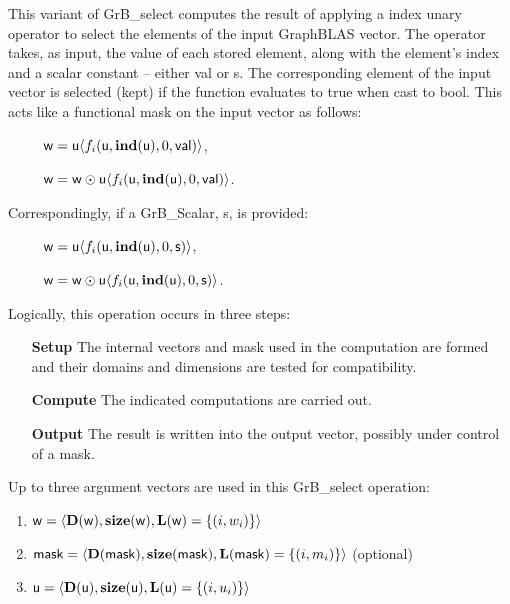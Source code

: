 This variant of {\sf GrB\_select} computes the result of applying a index unary operator
to select the elements of the input GraphBLAS vector.  The operator takes, as input,
the value of each stored element, along with the element's index and a scalar 
constant -- either {\sf val} or {\sf s}.  The corresponding element of the input vector is selected (kept)
if the function evaluates to {\sf true} when cast to {\sf bool}.  This acts like a
functional mask on the input vector as follows:
\begin{itemize}[leftmargin=2.1in]
\item[~] ${\sf w} = {\sf u}\langle f_i({\sf u}, \bold{ind}({\sf u}), 0, {\sf val})\rangle$,
\item[~] ${\sf w} = {\sf w} \odot {\sf u}\langle f_i({\sf u}, \bold{ind}({\sf u}), 0, {\sf val})\rangle$.  
\end{itemize}
Correspondingly, if a {\sf GrB\_Scalar}, {\sf s}, is provided:
\begin{itemize}[leftmargin=2.1in]
\item[~] ${\sf w} = {\sf u}\langle f_i({\sf u}, \bold{ind}({\sf u}), 0, {\sf s})\rangle$,
\item[~] ${\sf w} = {\sf w} \odot {\sf u}\langle f_i({\sf u}, \bold{ind}({\sf u}), 0, {\sf s})\rangle$.  
\end{itemize}

Logically, this operation occurs in three steps:
\begin{enumerate}[leftmargin=0.75in]
\item[\bf Setup] The internal vectors and mask used in the computation are formed 
and their domains and dimensions are tested for compatibility.
\item[\bf Compute] The indicated computations are carried out.
\item[\bf Output] The result is written into the output vector, possibly under 
control of a mask.
\end{enumerate}

Up to three argument vectors are used in this {\sf GrB\_select} operation:
\begin{enumerate}
    \item ${\sf w} = \langle \bold{D}({\sf w}),\bold{size}({\sf w}),
    \bold{L}({\sf w}) = \{(i,w_i) \} \rangle$

    \item ${\sf mask} = \langle \bold{D}({\sf mask}),\bold{size}({\sf mask}),
    \bold{L}({\sf mask}) = \{(i,m_i) \} \rangle$ (optional)

    \item ${\sf u} = \langle \bold{D}({\sf u}),\bold{size}({\sf u}),
    \bold{L}({\sf u}) = \{(i,u_i) \} \rangle$
\end{enumerate}

